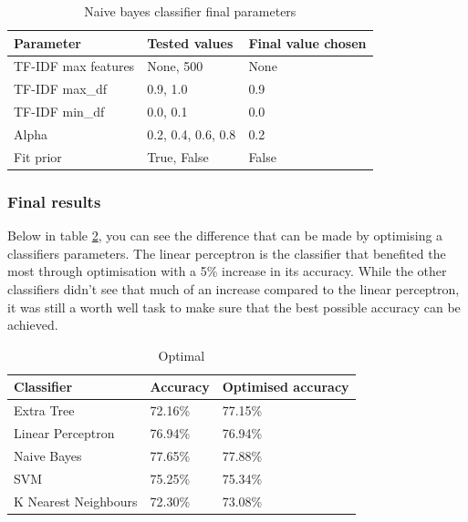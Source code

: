 \documentclass[a4paper,11pt]{report}
\begin{document}
\begin{table}[h!]
\centering
\caption{Naive bayes classifier final parameters}
\label{naive-bayes-finalp}
\begin{tabular}{|l|l|l|}
\hline
Parameter           & Tested values      & Final value chosen \\ \hline
TF-IDF max features & None, 500          & None               \\ \hline
TF-IDF max\_df      & 0.9, 1.0           & 0.9                \\ \hline
TF-IDF min\_df      & 0.0, 0.1           & 0.0                \\ \hline
Alpha               & 0.2, 0.4, 0.6, 0.8 & 0.2                \\ \hline
Fit prior           & True, False        & False              \\ \hline
\end{tabular}
\end{table}

\subsubsection{Final results}
Below in table \ref{final-optimised-results}, you can see the difference that can be made by optimising a classifiers parameters. The linear perceptron is the classifier that benefited the most through optimisation with a 5\% increase in its accuracy. While the other classifiers didn't see that much of an increase compared to the linear perceptron, it was still a worth well task to make sure that the best possible accuracy can be achieved.

\begin{table}[h!]
\centering
\caption{Optimal }
\label{final-optimised-results}
\begin{tabular}{|l|l|l|}
\hline
Classifier           & Accuracy & Optimised accuracy \\ \hline
Extra Tree           & 72.16\%  & 77.15\%            \\ \hline
Linear Perceptron    & 76.94\%  & 76.94\%            \\ \hline
Naive Bayes          & 77.65\%  & 77.88\%            \\ \hline
SVM                  & 75.25\%  & 75.34\%            \\ \hline
K Nearest Neighbours & 72.30\%  & 73.08\%            \\ \hline
\end{tabular}
\end{table}
\end{document}
